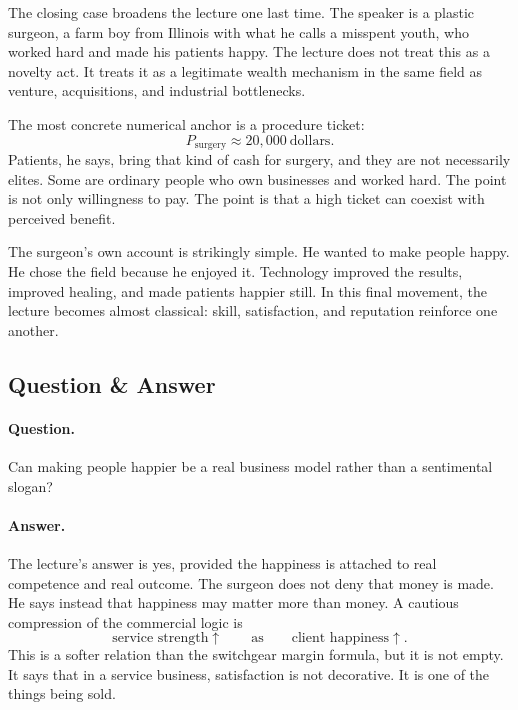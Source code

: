 The closing case broadens the lecture one last time. The speaker is a plastic surgeon, a farm boy from Illinois with what he calls a misspent youth, who worked hard and made his patients happy. The lecture does not treat this as a novelty act. It treats it as a legitimate wealth mechanism in the same field as venture, acquisitions, and industrial bottlenecks.

The most concrete numerical anchor is a procedure ticket:
\begin{equation}
P_{\text{surgery}} \approx 20{,}000 \ \text{dollars}.
\end{equation}
Patients, he says, bring that kind of cash for surgery, and they are not necessarily elites. Some are ordinary people who own businesses and worked hard. The point is not only willingness to pay. The point is that a high ticket can coexist with perceived benefit.

The surgeon's own account is strikingly simple. He wanted to make people happy. He chose the field because he enjoyed it. Technology improved the results, improved healing, and made patients happier still. In this final movement, the lecture becomes almost classical: skill, satisfaction, and reputation reinforce one another.

\subsection{Question \& Answer}

\paragraph{Question.} Can making people happier be a real business model rather than a sentimental slogan?

\paragraph{Answer.} The lecture's answer is yes, provided the happiness is attached to real competence and real outcome. The surgeon does not deny that money is made. He says instead that happiness may matter more than money. A cautious compression of the commercial logic is
\begin{equation}
\text{service strength} \uparrow
\qquad \text{as} \qquad
\text{client happiness} \uparrow.
\end{equation}
This is a softer relation than the switchgear margin formula, but it is not empty. It says that in a service business, satisfaction is not decorative. It is one of the things being sold.

